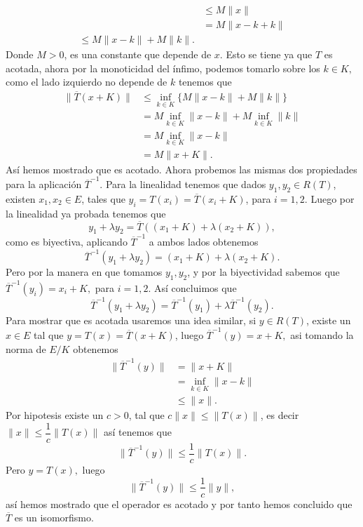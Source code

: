 \begin{itemize}
\begin{sproof}
\begin{align*}
              &\leq M\|x\|\\
              &=M\|x-k+k\|\\
              \leq M\|x-k\|+M\|k\|.
          \end{align*}
          Donde $M>0$, es una constante que depende de $x$. Esto se tiene ya que $T$ es acotada, ahora por la monoticidad del ínfimo, podemos tomarlo sobre los $k\in K,$ como el lado izquierdo no depende de $k$ tenemos que
          \begin{align*}
              \|\overline{T}(x+K)\|&\leq\inf_{k\in K}\{M\|x-k\|+M\|k\|\}\\
              &= M\inf_{k\in K}\|x-k\|+M\inf_{k\in K}\|k\|\\
              &=M\inf_{k\in K}\|x-k\|\\
              &=M\|x+K\|.
          \end{align*}
          Así hemos mostrado que es acotado. Ahora probemos las mismas dos propiedades para la aplicación $\overline{T}^{-1}.$ Para la linealidad tenemos que dados $y_1,y_2\in R(T)$, existen $x_1,x_2\in E$, tales que $y_i=T(x_i)=\overline{T}(x_i+K)$, para $i=1,2.$ Luego por la linealidad ya probada tenemos que $$y_1+\lambda y_2=\overline{T}((x_1+K)+\lambda(x_2+K)),$$ 
          como es biyectiva, aplicando $\overline{T}^{-1}$ a ambos lados obtenemos $$\overline{T}^{-1}(y_1+\lambda y_2)=(x_1+K)+\lambda(x_2+K).$$
          Pero por la manera en que tomamos $y_1,y_2$, y por la biyectividad sabemos que $\overline{T}^{-1}(y_i)=x_i+K,$ para $i=1,2.$ Así concluimos que 
          $$\overline{T}^{-1}(y_1+\lambda y_2)=\overline{T}^{-1}(y_1)+\lambda\overline{T}^{-1}(y_2).$$
          Para mostrar que es acotada usaremos una idea similar, si $y\in R(T)$, existe un $x\in E$ tal que $y=T(x)=\overline{T}(x+K)$, luego $\overline{T}^{-1}(y)=x+K,$ asi tomando la norma de $E/K$ obtenemos
          \begin{align*}
              \|\overline{T}^{-1}(y)\|&=\|x+K\|\\
              &=\inf_{k\in K}\|x-k\|\\
              &\leq \|x\|.
          \end{align*}
          Por hipotesis existe un $c>0$, tal que $c\|x\|\leq\|T(x)\|$, es decir $\|x\|\leq \dfrac{1}{c}\|T(x)\|$ así tenemos que
          $$\|\overline{T}^{-1}(y)\|\leq \dfrac{1}{c}\|T(x)\|.$$
          Pero $y=T(x),$ luego 
          $$\|\overline{T}^{-1}(y)\|\leq \dfrac{1}{c}\|y\|,$$
          así hemos mostrado que el operador es acotado y por tanto hemos concluido que $\overline{T}$ es un isomorfismo.

    \end{sproof}
    
\end{itemize}
